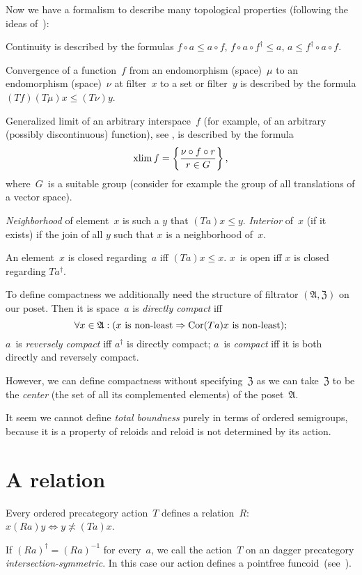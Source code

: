 Now we have a formalism to describe many topological properties (following the ideas of~\cite{volume-1}):

Continuity is described by the formulas $f\circ a\leq a\circ f$, $f\circ a\circ f^{\dagger}\leq a$, $a\leq f^{\dagger}\circ a\circ f$.

Convergence of a function~$f$ from an endomorphism (space)~$\mu$ to an endomorphism (space)~$\nu$ at filter~$x$ to a set or filter~$y$ is described by the formula $(Tf)(T\mu)x\leq(T\nu)y$.

Generalized limit of an arbitrary interspace~$f$ (for example, of an arbitrary (possibly discontinuous) function), see \cite{limit}, is described by the formula \[ \operatorname{xlim} f=\left\{ \frac{\nu\circ f\circ r}{r\in G}\right\}, \]
where~$G$~is a suitable group (consider for example the group of all translations of a vector space).

\emph{Neighborhood} of element~$x$ is such a $y$ that $(Ta)x\leq y$. \emph{Interior} of~$x$ (if it exists) if the join of all $y$ such that $x$ is a neighborhood of~$x$.

An element~$x$ is closed regarding~$a$ iff $(Ta)x\leq x$. $x$~is open iff $x$ is closed regarding $Ta^{\dagger}$.

To define compactness we additionally need the structure of filtrator $(\mathfrak{A},\mathfrak{Z})$ on our poset. Then it is space~$a$ is \emph{directly compact} iff
\[\forall x\in\mathfrak{A}:(x\text{ is non-least}\Rightarrow\operatorname{Cor}(Ta)x\text{ is non-least}); \]
$a$~is \emph{reversely compact} iff $a^{\dagger}$ is directly compact; $a$~is \emph{compact} iff it is both directly and reversely compact.

However, we can define compactness without specifying~$\mathfrak{Z}$ as we can take~$\mathfrak{Z}$ to be the \emph{center} (the set of all its complemented elements) of the poset~$\mathfrak{A}$.

It seem we cannot define \emph{total boundness} purely in terms of ordered semigroups, because it is a property of reloids and reloid is not determined by its action.

\chapter{A relation}

Every ordered precategory action~$T$ defines a relation~$R$: $x(Ra)y\Leftrightarrow y\nasymp(Ta)x$.

If $(Ra)^{\dagger}=(Ra)^{-1}$ for every~$a$, we call the action~$T$ on an dagger precategory \emph{inter\-sec\-tion-sym\-met\-ric}. In this case our action defines a pointfree funcoid~(see~\cite{volume-1}).

